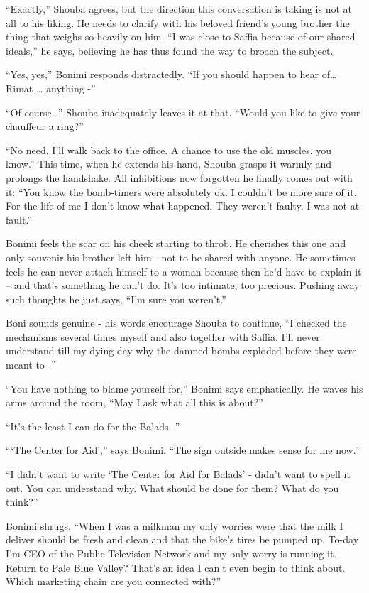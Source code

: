 \documentclass[twoside,11pt]{book}
\begin{document}
``Exactly,'' Shouba agrees, but the direction this conversation is taking is not at all to his
liking. He needs to clarify with his beloved friend's young brother the thing that weighs so heavily on him.
``I was close to Saffia because of our shared ideals,'' he says, believing he has thus found
the way to broach the subject.

``Yes, yes,'' Bonimi responds distractedly. ``If you should happen to hear
of{\dots} Rimat {\dots} anything -''

``Of course{\dots}'' Shouba inadequately leaves it
at that. ``Would you like to give your chauffeur a ring?''

``No need. I'll walk back to the office. A chance to use the old muscles, you know.'' This
time, when he extends his hand, Shouba grasps it warmly and prolongs the handshake. All inhibitions now forgotten he
finally comes out with it: ``You know the bomb-timers were absolutely ok. I couldn't be more sure of it.
For the life of me I don't know what happened. They weren't faulty. I was not at fault.''

Bonimi  feels the scar on his cheek starting to throb. He cherishes this one and only souvenir his brother left him -
not to be shared with anyone. He sometimes feels he can never attach himself to a woman because then he'd have to
explain it -- and that's something he can't do. It's too intimate, too precious. Pushing away such thoughts he just
says, ``I'm sure you weren't.''

Boni sounds genuine - his words encourage Shouba to continue, ``I checked the mechanisms several times
myself and also together with Saffia. I'll never understand till my dying day
why the damned bombs exploded before they were meant to -''

``You have nothing to blame yourself for,'' Bonimi says emphatically. He waves his arms around
the room, ``May I ask what all this is about?''

``It's the least I can do for the Balads -''

``{`The Center for Aid'},'' says Bonimi. ``The sign outside makes sense for me
now.''

``I didn't want to write `The Center for Aid for Balads' - didn't want to spell it out. You can understand
why. What should be done for them? What do you think?''

Bonimi shrugs. ``When I was a milkman my only worries were that the milk I deliver should be fresh and
clean and that the bike's tires be pumped up. To-day I'm CEO of the Public Television Network and my only worry is
running it.  Return to Pale Blue Valley? That's an idea I can't even begin to think about. Which marketing chain are
you connected with?''
\end{document}
